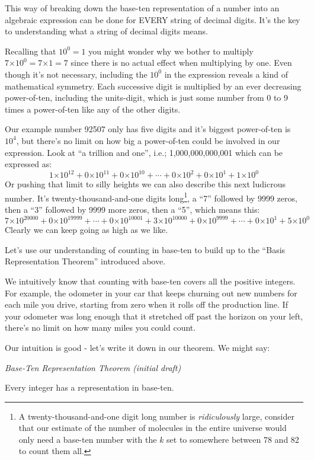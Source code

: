 \documentclass{article}
\newenvironment{jprIn}{\begin{adjustwidth}{2em}{}}{\end{adjustwidth}}
\begin{document}
This way of breaking down the base-ten representation of a number into
an algebraic expression can be done for EVERY string of decimal digits. It's the key to 
understanding what a string of decimal digits means.

Recalling that $10^0 = 1$ you might wonder why we bother to multiply
$7{\times{}}10^0=7{\times{}}1=7$ since there is no actual effect
when multiplying by one.
Even though it's not necessary, including the $10^0$ in the
expression reveals a kind of mathematical symmetry.
Each successive digit is multiplied by an ever
decreasing power-of-ten, including
the units-digit,
which is just some number from 0 to 9 times a power-of-ten
like any of the other digits.

Our example number 92507 only has five digits and it's biggest power-of-ten is $10^4$,
but there's
no limit on how big a power-of-ten could be involved in our expression.
Look at ``a trillion and one'', i.e.; 1,000,000,000,001 which can be expressed as:
\[1{\times{}}10^{12}
+0{\times{}}10^{11}
+0{\times{}}10^{10}
+\cdots{}
+0{\times{}}10^{2}
+0{\times{}}10^{1}
+1{\times{}}10^{0}\]
%
Or pushing that limit to silly heights we can also describe this next ludicrous number.
It's twenty-thousand-and-one digits long\footnote{A twenty-thousand-and-one digit long number is 
\emph{ridiculously} large,
consider that our estimate of the number of molecules in
the entire universe would only need a base-ten
number with the $k$ set to somewhere between 78 and 82 to count them all.}, a
``7'' followed by 9999 zeros, then a ``3''
followed by 9999 more zeros, then a ``5'', which means this:
\[7{\times{}}10^{20000}
+0{\times{}}10^{19999}
+\cdots{}
+0{\times{}}10^{10001}
+3{\times{}}10^{10000}
+0{\times{}}10^{9999}
+\cdots{}
+0{\times{}}10^{1}
+5{\times{}}10^{0}\]
Clearly we can keep going as high as we like.

Let's use our understanding of counting in base-ten to build up to the
``Basis Representation Theorem'' introduced above.

We intuitively know that counting with
base-ten covers all the positive integers.
For example, the odometer in your car that keeps churning out
new numbers for each mile you drive, starting from zero when it rolls
off the production line.  If your odometer was long enough that it 
stretched off past the horizon on your left, there's no limit on
how many miles you could count.

Our intuition is good - let's write it down
in our theorem. We might say:

\emph{Base-Ten Representation Theorem (initial draft)}
\begin{jprIn}
Every integer has a representation in base-ten.
\end{jprIn}
\end{document}
